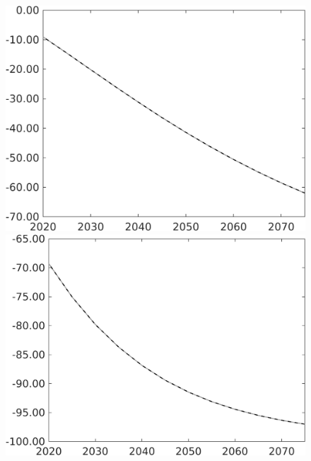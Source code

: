 \documentclass[12pt]{article}
\begin{document}
\begin{figure}[h!!]
\begin{minipage}[]{0.32\textwidth}
	\end{minipage}	
	\begin{minipage}[]{0.32\textwidth}
		\includegraphics[width=1\textwidth]{../../codding_model/own_basedOnFried/optimalPol_010922_revision/figures/all_13Sept22/PerdifNoTauf_Equlab_regime0_CompTaul_pg_spillover0_nsk1_xgr0_knspil1_sep1_LFlimit0_emsbase0_countec0_GovRev0_etaa0.79_lgd0.png}
	\end{minipage}	
	\begin{minipage}[]{0.32\textwidth}
	\includegraphics[width=1\textwidth]{../../codding_model/own_basedOnFried/optimalPol_010922_revision/figures/all_13Sept22/PerdifNoTauf_Equlab_regime0_CompTaul_pgpftf_spillover0_nsk1_xgr0_knspil1_sep1_LFlimit0_emsbase0_countec0_GovRev0_etaa0.79_lgd0.png}

\end{minipage}
\end{figure}
\end{document}
